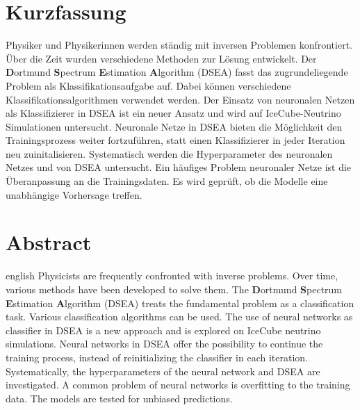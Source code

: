 \thispagestyle{plain}

\section*{Kurzfassung}
Physiker und Physikerinnen werden ständig mit inversen Problemen konfrontiert.
Über die Zeit wurden verschiedene Methoden zur Lösung entwickelt.
Der \textbf{D}ortmund \textbf{S}pectrum \textbf{E}stimation \textbf{A}lgorithm (DSEA) fasst das zugrundeliegende Problem als Klassifikationsaufgabe auf.
Dabei können verschiedene Klassifikationsalgorithmen verwendet werden.
Der Einsatz von neuronalen Netzen als Klassifizierer in DSEA ist ein neuer Ansatz und wird auf IceCube-Neutrino Simulationen untersucht.
Neuronale Netze in DSEA bieten die Möglichkeit den Trainingsprozess weiter fortzuführen, statt einen Klassifizierer in jeder Iteration neu zuinitalisieren.
Systematisch werden die Hyperparameter des neuronalen Netzes und von DSEA untersucht.
Ein häufiges Problem neuronaler Netze ist die Überanpassung an die Trainingsdaten.
Es wird geprüft, ob die Modelle eine unabhängige Vorhersage treffen.

\section*{Abstract}
\begin{foreignlanguage}{english}
Physicists are frequently confronted with inverse problems.
Over time, various methods have been developed to solve them.
The \textbf{D}ortmund \textbf{S}pectrum \textbf{E}stimation \textbf{A}lgorithm (DSEA) treats the fundamental problem as a classification task.
Various classification algorithms can be used.
The use of neural networks as classifier in DSEA is a new approach and is explored on IceCube neutrino simulations.
Neural networks in DSEA offer the possibility to continue the training process, instead of reinitializing the classifier in each iteration.
Systematically, the hyperparameters of the neural network and DSEA are investigated.
A common problem of neural networks is overfitting to the training data.
The models are tested for unbiased predictions.
\end{foreignlanguage}
